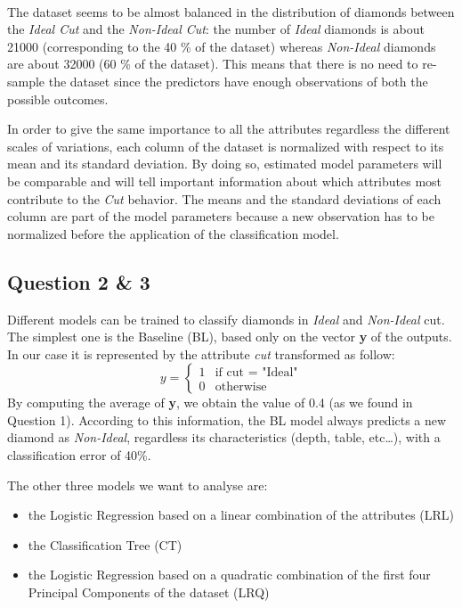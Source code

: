 \documentclass[
]{article}
\providecommand{\tightlist}{%
  \setlength{\itemsep}{0pt}\setlength{\parskip}{0pt}}
\begin{document}
~

The dataset seems to be almost balanced in the distribution of diamonds
between the \emph{Ideal Cut} and the \emph{Non-Ideal Cut}: the number of
\emph{Ideal} diamonds is about 21000 (corresponding to the 40 \% of the
dataset) whereas \emph{Non-Ideal} diamonds are about 32000 (60 \% of the
dataset). This means that there is no need to re-sample the dataset
since the predictors have enough observations of both the possible
outcomes.

In order to give the same importance to all the attributes regardless
the different scales of variations, each column of the dataset is
normalized with respect to its mean and its standard deviation. By doing
so, estimated model parameters will be comparable and will tell
important information about which attributes most contribute to the
\emph{Cut} behavior. The means and the standard deviations of each
column are part of the model parameters because a new observation has to
be normalized before the application of the classification model.

\hypertarget{question-2-3}{%
\subsection{Question 2 \& 3}\label{question-2-3}}

Different models can be trained to classify diamonds in \emph{Ideal} and
\emph{Non-Ideal} cut. The simplest one is the Baseline (BL), based only
on the vector \textbf{y} of the outputs. In our case it is represented
by the attribute \emph{cut} transformed as follow: \[ y =
\begin{cases}
1 & \text{if cut = "Ideal"} \\
0 & \text{otherwise}
\end{cases} \] By computing the average of \textbf{y}, we obtain the
value of 0.4 (as we found in Question 1). According to this information,
the BL model always predicts a new diamond as \emph{Non-Ideal},
regardless its characteristics (depth, table, etc\ldots), with a
classification error of 40\%.

The other three models we want to analyse are:

\begin{itemize}
\tightlist
\item
  the Logistic Regression based on a linear combination of the
  attributes (LRL)
\item
  the Classification Tree (CT)
\item
  the Logistic Regression based on a quadratic combination of the first
  four Principal Components of the dataset (LRQ)
\end{itemize}
\end{document}
